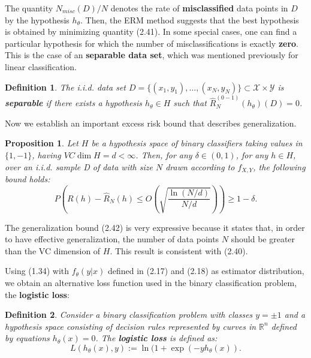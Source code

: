 \documentclass{report}
\newtheorem{definition}{Definition}[chapter]
\newtheorem{proposition}{Proposition}[chapter]
\begin{document}
The quantity $N_{misc}(D)/N$ denotes the rate of \textbf{misclassified} data points in $D$ by the hypothesis $h_\theta$. Then, the ERM method suggests that the best hypothesis is obtained by minimizing quantity (2.41). In some special cases, one can find a particular hypothesis for which the number of misclassifications is exactly \textbf{zero}. This is the case of an \textbf{separable data set}, which was mentioned previously for linear classification.

\begin{definition}
The i.i.d. data set $D = \{(x_1,y_1), \dots, (x_N,y_N)\} \subset \mathcal{X} \times \mathcal{Y}$ is \textbf{separable} if there exists a hypothesis $h_\theta \in H$ such that $\hat{R}^{(0-1)}_N(h_\theta)(D) = 0$.
\end{definition}

Now we establish an important excess risk bound that describes generalization.

\begin{proposition}
Let $H$ be a hypothesis space of binary classifiers taking values in $\{1, -1\}$, having $VC\dim H = d < \infty$. Then, for any $\delta \in (0,1)$, for any $h \in H$, over an i.i.d. sample D of data with size $N$ drawn according to $f_{X,Y}$, the following bound holds:
\begin{equation}
P\left(R(h) - \hat{R}_N(h) \leq O\left(\sqrt{\frac{\ln(N/d)}{N/d}}\right)\right) \geq 1-\delta.
\end{equation}
\end{proposition}

The generalization bound (2.42) is very expressive because it states that, in order to have effective generalization, the number of data points $N$ should be greater than the VC dimension of $H$. This result is consistent with (2.40).

Using (1.34) with $f_\theta(y|x)$ defined in (2.17) and (2.18) as estimator distribution, we obtain an alternative loss function used in the binary classification problem, the \textbf{logistic loss}:

\begin{definition}
Consider a binary classification problem with classes $y=\pm 1$ and a hypothesis space consisting of decision rules represented by curves in $\mathbb{R}^n$ defined by equations $h_\theta(x) = 0$. The \textbf{logistic loss} is defined as:
\begin{equation}
L(h_\theta(x), y) := \ln(1+\exp(-yh_\theta(x)).
\end{equation}
\end{definition}
\end{document}
